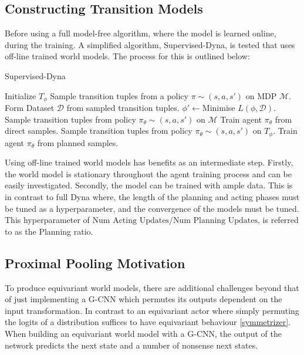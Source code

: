 \subsection{Constructing Transition Models}
Before using a full model-free algorithm, where the model is learned online, during the training. A simplified algorithm, Supervised-Dyna, is tested that uses off-line trained world models. The process for this is outlined below:
\begin{algorithm}
	\label{alg:Supervised-Dyna}
	\caption{Supervised-Dyna}
	\begin{algorithmic}
		\State Initialize $T_\phi$
		\State Sample transition tuples from a policy $\pi \sim (s, a, s')$ on MDP $\mathcal{M}$.
		\State Form Dataset $\mathcal{D}$ from sampled transition tuples.
		\State $\phi' \leftarrow $Minimise $L(\phi , \mathcal{D})$.
		\EndFor
		\State Sample transition tuples from policy $\pi_\theta \sim (s, a, s')$ on $\mathcal{M}$
		\State Train agent $\pi_\theta$ from direct samples.
		\EndFor
		\State Sample transition tuples from policy $\pi_\theta \sim (s, a, s')$ on $T_\phi$.
		\State Train agent $\pi_\theta$ from planned samples.
		\EndFor
		\EndFor
	\end{algorithmic}
\end{algorithm}

Using off-line trained world models has benefits as an intermediate step. Firstly, the world model is stationary throughout the agent training process and can be easily investigated. Secondly, the model can be trained with ample data. This is in contrast to full Dyna where, the length of the planning and acting phases must be tuned as a hyperparameter, and the convergence of the models must be tuned. This hyperparameter of $\text{Num Acting Updates}/\text{Num Planning Updates}$, is referred to as the Planning ratio.


\subsection{Proximal Pooling Motivation}

To produce equivariant world models, there are additional challenges beyond that of just implementing a G-CNN which permutes its outputs dependent on the input transformation. In contrast to an equivariant actor where simply permuting the logits of a distribution suffices to have equivariant behaviour \ref{symmetrizer}. When building an equivariant world model with a G-CNN, the output of the network predicts the next state and a number of nonsense next states.

